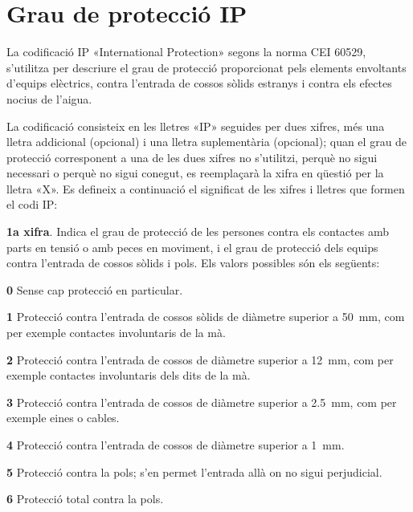 \section{Grau de protecció IP}   

La codificació IP «International Protection»  segons la
norma CEI 60529, s'utilitza per descriure el grau de
protecció  proporcionat pels elements envoltants d'equips elèctrics, contra
l'entrada de cossos sòlids estranys i contra els efectes nocius
de l'aigua.

La codificació consisteix en les lletres «IP»
seguides per dues xifres, més una lletra addicional (opcional) i una
lletra suplementària (opcional); quan el grau de protecció
corresponent a una de les dues xifres no s'utilitzi, perquè no sigui
necessari o perquè no sigui conegut, es reemplaçarà la xifra en
qüestió per la lletra «X». Es defineix a continuació el
significat de les xifres i lletres que formen el codi IP:

\textbf{1a xifra}. Indica el grau de protecció de les persones contra els contactes amb
parts en tensió o amb peces en moviment, i el grau de protecció dels equips contra l'entrada de cossos sòlids i pols. Els valors possibles són els següents:
\begin{list}{}
   {\setlength{\labelwidth}{10mm} \setlength{\leftmargin}{10mm} \setlength{\labelsep}{2mm}}
   \item[\textbf{0}] Sense cap protecció en particular.
   \item[\textbf{1}] Protecció contra l'entrada de cossos sòlids de diàmetre superior a \SI{50}{mm},
   com per exemple   contactes involuntaris de la mà.
   \item[\textbf{2}] Protecció contra l'entrada de cossos de diàmetre superior a \SI{12}{mm}, com per exemple
   contactes involuntaris dels dits de la mà.
   \item[\textbf{3}] Protecció contra l'entrada de cossos de diàmetre superior a \SI{2,5}{mm},
   com per exemple eines o cables.
   \item[\textbf{4}] Protecció contra l'entrada de cossos de diàmetre superior a \SI{1}{mm}.
   \item[\textbf{5}] Protecció contra la pols; s'en permet l'entrada allà on no sigui perjudicial.
   \item[\textbf{6}] Protecció total contra la pols.
\end{list}

